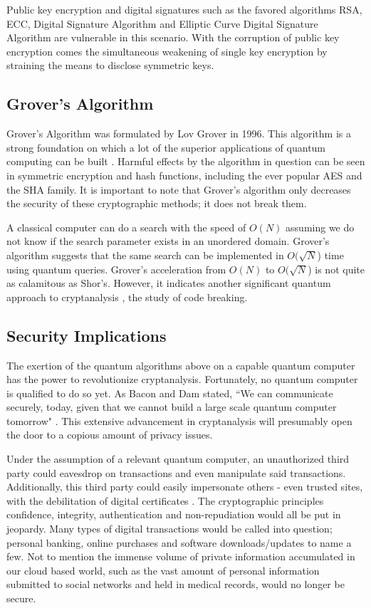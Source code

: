 Public key encryption and digital signatures such as the favored algorithms RSA, ECC, Digital Signature Algorithm and Elliptic Curve Digital Signature Algorithm are vulnerable in this scenario. With the corruption of public key encryption comes the simultaneous weakening of single key encryption by straining the means to disclose symmetric keys.

\subsection{Grover's Algorithm}
Grover's Algorithm was formulated by Lov Grover in 1996. This algorithm is a strong foundation on which a lot of the superior applications of quantum computing can be built \cite{Post_Q_Cryptog}. Harmful effects by the algorithm in question can be seen in symmetric encryption and hash functions, including the ever popular AES and the SHA family. It is important to note that Grover's algorithm only decreases the security of these cryptographic methods; it does not break them.

A classical computer can do a search with the speed of \(O(N)\) assuming we do not know if the search parameter exists in an unordered domain. Grover's algorithm suggests that the same search can be implemented in \(O(\sqrt{N}\)) time using quantum queries. Grover's acceleration from \(O(N)\) to \(O(\sqrt{N}\)) is not quite as calamitous as Shor's. However, it indicates another significant quantum approach to cryptanalysis \cite{Quantum_Cryptanal}, the study of code breaking. 

\subsection{Security Implications}
The exertion of the quantum algorithms above on a capable quantum computer has the power to revolutionize cryptanalysis. Fortunately, no quantum computer is qualified to do so yet. As Bacon and Dam stated, ``We can communicate securely, today, given that we cannot build a large scale quantum computer tomorrow" \cite{Q_Alg}. This extensive advancement in cryptanalysis will presumably open the door to a copious amount of privacy issues. 

Under the assumption of a relevant quantum computer, an unauthorized third party could eavesdrop on transactions and even manipulate said transactions. Additionally, this third party could easily impersonate others - even trusted sites, with the debilitation of digital certificates \cite{Sec_Risk}. The cryptographic principles confidence, integrity, authentication and non-repudiation would all be put in jeopardy. Many types of digital transactions would be called into question; personal banking, online purchases and software downloads/updates to name a few. Not to mention the immense volume of private information accumulated in our cloud based world, such as the vast amount of personal information submitted to social networks and held in medical records, would no longer be secure. 

